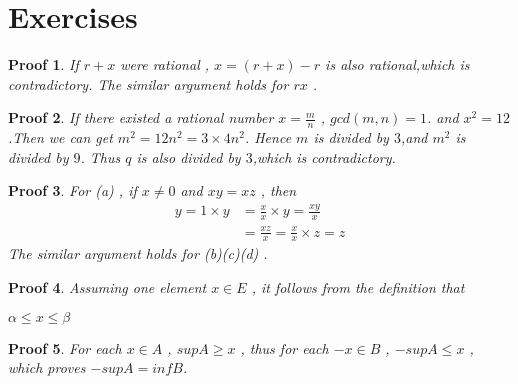 \documentclass{report}
\newtheorem{myprf}{Proof}
\begin{document}
        \section{Exercises}
            \begin{myprf}
                If $r+x$  were rational , $x=(r+x)-r$ is also rational,which is contradictory. 
                The similar argument holds for $rx$ .
            \end{myprf}   
            \begin{myprf}
                If there existed a rational number $x=\frac{m}{n}$ , $gcd(m,n)=1$.
                and $x^{2}=12$.Then we can get $m^{2}=12n^{2}=3\times4n^{2}$.
                Hence $m$ is divided by $3$,and $m^{2}$ is divided by $9$.
                Thus $q$ is also divided by $3$,which is contradictory.
            \end{myprf} 
            \begin{myprf}
                For (a) , 
                if $x\not=0$ and $xy=xz$ , then 
                \begin{align*}
                    y=1 \times y&=\frac{x}{x} \times y=\frac{xy}{x}\\
                                &=\frac{xz}{x}=\frac{x}{x} \times z=z
                \end{align*}
                The similar argument holds for (b)(c)(d) .
            \end{myprf} 
            \begin{myprf}
                Assuming one element $x\in E$ , it follows from the definition that\\
                \centerline{$\alpha \le x \le \beta$}
            \end{myprf} 
            \begin{myprf}
                For each $x \in A$ , $supA \ge x$ , 
                thus for each $-x \in B$ , $-supA \le x$ , which proves $-supA=infB$. 
            \end{myprf} 
\end{document}
